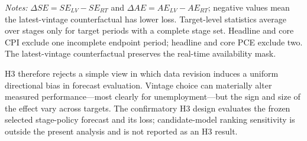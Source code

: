 \begin{table}[H]
\centering
\caption{H3: target-level real-time versus latest-vintage loss differences}
\label{tab:h3_vintage_effect}
\scriptsize
\setlength{\tabcolsep}{2.8pt}
\par\medskip
\begin{minipage}{0.94\textwidth}
\footnotesize
\textit{Notes:} \(\Delta SE=SE_{LV}-SE_{RT}\) and
\(\Delta AE=AE_{LV}-AE_{RT}\); negative values mean the latest-vintage
counterfactual has lower loss.  Target-level statistics average over stages
only for target periods with a complete stage set.  Headline and core CPI
exclude one incomplete endpoint period; headline and core PCE exclude two.
The latest-vintage counterfactual preserves the real-time availability mask.
\end{minipage}
\end{table}

H3 therefore rejects a simple view in which data revision induces a uniform
directional bias in forecast evaluation.  Vintage choice can materially alter
measured performance---most clearly for unemployment---but the sign and size
of the effect vary across targets.  The confirmatory H3 design evaluates the
frozen selected stage-policy forecast and its loss; candidate-model ranking
sensitivity is outside the present analysis and is not reported as an H3
result.

